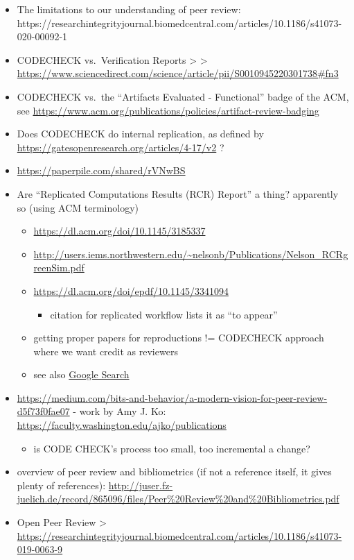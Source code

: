 \documentclass[12pt]{article}
\begin{document}
\begin{itemize}
\item The limitations to our understanding of peer review: https://researchintegrityjournal.biomedcentral.com/articles/10.1186/s41073-020-00092-1
\item
  CODECHECK vs.~Verification Reports \textgreater{} \textgreater{}
  \url{https://www.sciencedirect.com/science/article/pii/S0010945220301738\#fn3}
\item
  CODECHECK vs.~the ``Artifacts Evaluated - Functional'' badge of the
  ACM, see
  \url{https://www.acm.org/publications/policies/artifact-review-badging}
\item
  Does CODECHECK do internal replication, as defined by
  \url{https://gatesopenresearch.org/articles/4-17/v2} ?
\item
  \url{https://paperpile.com/shared/rVNwBS}
\item
  Are ``Replicated Computations Results (RCR) Report'' a thing?
  apparently so (using ACM terminology)

  \begin{itemize}
  \item
    \url{https://dl.acm.org/doi/10.1145/3185337}
  \item
    \url{http://users.iems.northwestern.edu/~nelsonb/Publications/Nelson_RCRgreenSim.pdf}
  \item
    \url{https://dl.acm.org/doi/epdf/10.1145/3341094}

    \begin{itemize}
    \item
      citation for replicated workflow lists it as ``to appear''
    \end{itemize}
  \item
    getting proper papers for reproductions != CODECHECK approach where
    we want credit as reviewers
  \item
    see also
    \href{https://www.google.com/search?q=\%22Replicated+Computations+Results+\%28RCR\%29+Report+for\%22}{Google
    Search}
  \end{itemize}
\item
  \url{https://medium.com/bits-and-behavior/a-modern-vision-for-peer-review-d5f73f0fae07}
  - work by Amy J. Ko:
  \url{https://faculty.washington.edu/ajko/publications}

  \begin{itemize}
  \item
    is CODE CHECK's process too small, too incremental a change?
  \end{itemize}
\item
  overview of peer review and bibliometrics (if not a reference itself,
  it gives plenty of references):
  \url{http://juser.fz-juelich.de/record/865096/files/Peer\%20Review\%20and\%20Bibliometrics.pdf}
\item
  Open Peer Review \textgreater{}
  \url{https://researchintegrityjournal.biomedcentral.com/articles/10.1186/s41073-019-0063-9}


\end{itemize}
\end{document}
